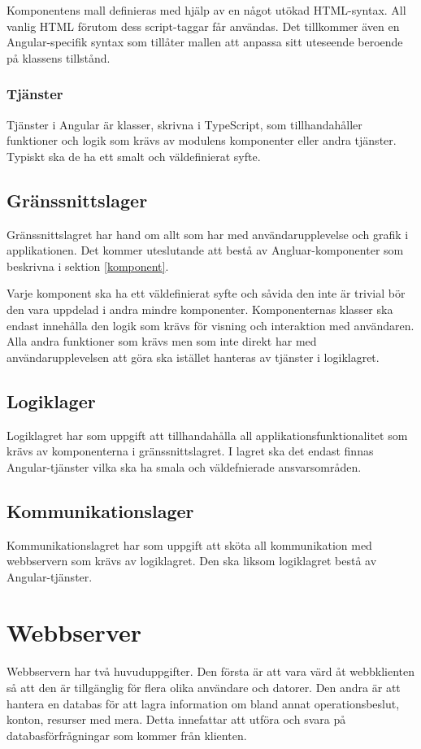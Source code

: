 \documentclass[a4paper,10pt]{article}
\begin{document}
Komponentens mall definieras med hjälp av en något utökad HTML-syntax. All vanlig HTML förutom dess script-taggar får användas. Det tillkommer även en Angular-specifik syntax som tillåter mallen att anpassa sitt uteseende beroende på klassens tillstånd.
\subsubsection{Tjänster}
Tjänster i Angular är klasser, skrivna i TypeScript, som tillhandahåller funktioner och logik som krävs av modulens komponenter eller andra tjänster. Typiskt ska de ha ett smalt och väldefinierat syfte.

\subsection{Gränssnittslager}
Gränssnittslagret har hand om allt som har med användarupplevelse och grafik i applikationen. Det kommer uteslutande att bestå av Angluar-komponenter som beskrivna i sektion \ref{komponent}.

Varje komponent ska ha ett väldefinierat syfte och såvida den inte är trivial bör den vara uppdelad i andra mindre komponenter. Komponenternas klasser ska endast innehålla den logik som krävs för visning och interaktion med användaren. Alla andra funktioner som krävs men som inte direkt har med användarupplevelsen att göra ska istället hanteras av tjänster i logiklagret.

\subsection{Logiklager}
Logiklagret har som uppgift att tillhandahålla all applikationsfunktionalitet som krävs av komponenterna i gränssnittslagret. I lagret ska det endast finnas Angular-tjänster vilka ska ha smala och väldefnierade ansvarsområden.

\subsection{Kommunikationslager}
Kommunikationslagret har som uppgift att sköta all kommunikation med webbservern som krävs av logiklagret. Den ska liksom logiklagret bestå av Angular-tjänster.

\section{Webbserver}
Webbservern har två huvuduppgifter. Den första är att vara värd åt webbklienten så att den är tillgänglig för flera olika användare och datorer. Den andra är att hantera en databas för att lagra information om bland annat operationsbeslut, konton, resurser med mera. Detta innefattar att utföra och svara på databasförfrågningar som kommer från klienten.
\end{document}
